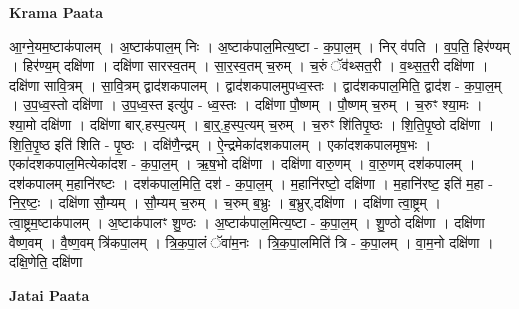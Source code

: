 \documentclass[17pt]{extarticle}
\begin{document}
\textbf{Krama Paata} \newline

आ॒ग्ने॒यम॒ष्टाक॑पालम् । अ॒ष्टाक॑पाल॒म् निः । अ॒ष्टाक॑पाल॒मित्य॒ष्टा - क॒पा॒ल॒म् । निर् व॑पति । व॒प॒ति॒ हिर॑ण्यम् । हिर॑ण्य॒म् दक्षि॑णा । दक्षि॑णा सारस्व॒तम् । सा॒र॒स्व॒तम् च॒रुम् । च॒रुं ॅव॑थ्सत॒री । व॒थ्स॒त॒री दक्षि॑णा । दक्षि॑णा सावि॒त्रम् । सा॒वि॒त्रम् द्वाद॑शकपालम् । द्वाद॑शकपालमुपध्व॒स्तः । द्वाद॑शकपाल॒मिति॒ द्वाद॑श - क॒पा॒ल॒म् । उ॒प॒ध्व॒स्तो दक्षि॑णा । उ॒प॒ध्व॒स्त इत्यु॑प - ध्व॒स्तः । दक्षि॑णा पौ॒ष्णम् । पौ॒ष्णम् च॒रुम् । च॒रुꣳ श्या॒मः । श्या॒मो दक्षि॑णा । दक्षि॑णा बार्.हस्प॒त्यम् । बा॒र्॒.ह॒स्प॒त्यम् च॒रुम् । च॒रुꣳ शि॑तिपृ॒ष्ठः । शि॒ति॒पृ॒ष्ठो दक्षि॑णा । शि॒ति॒पृ॒ष्ठ इति॑ शिति - पृ॒ष्ठः । दक्षि॑णै॒न्द्रम् । ऐ॒न्द्रमेका॑दशकपालम् । एका॑दशकपालमृष॒भः । एका॑दशकपाल॒मित्येका॑दश - क॒पा॒ल॒म् । ऋ॒ष॒भो दक्षि॑णा । दक्षि॑णा वारु॒णम् । वा॒रु॒णम् दश॑कपालम् । दश॑कपालम् म॒हानि॑रष्टः । दश॑कपाल॒मिति॒ दश॑ - क॒पा॒ल॒म् । म॒हानि॑रष्टो॒ दक्षि॑णा । म॒हानि॑रष्ट॒ इति॑ म॒हा - नि॒र॒ष्टः॒ । दक्षि॑णा सौ॒म्यम् । सौ॒म्यम् च॒रुम् । च॒रुम् ब॒भ्रुः । ब॒भ्रुर्,दक्षि॑णा । दक्षि॑णा त्वा॒ष्ट्रम् । त्वा॒ष्ट्रम॒ष्टाक॑पालम् । अ॒ष्टाक॑पालꣳ शु॒ण्ठः । अ॒ष्टाक॑पाल॒मित्य॒ष्टा - क॒पा॒ल॒म् । शु॒ण्ठो दक्षि॑णा । दक्षि॑णा वैष्ण॒वम् । वै॒ष्ण॒वम् त्रि॑कपा॒लम् । त्रि॒क॒पा॒लं ॅवा॑म॒नः । त्रि॒क॒पा॒लमिति॑ त्रि - क॒पा॒लम् । वा॒म॒नो दक्षि॑णा । दक्षि॒णेति॒ दक्षि॑णा \newline

\textbf{Jatai Paata} \newline
\end{document}
